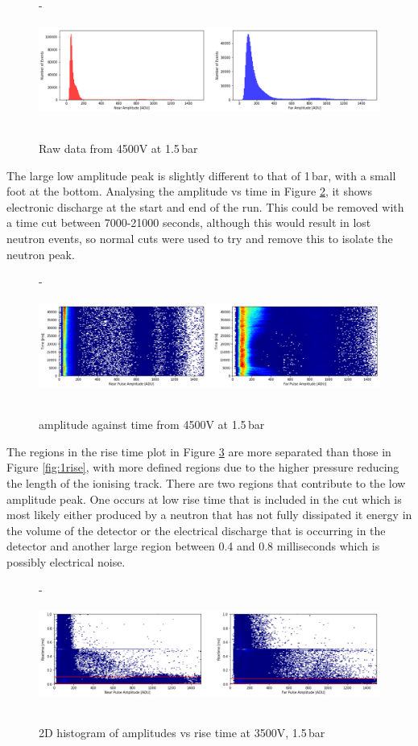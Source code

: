 \documentclass[a4paper]{article}
\begin{document}
\begin{figure}[H]- 
    \centering
    \includegraphics[height=3.7cm]{uk24n002_ampbefore.png}
    \caption{Raw data from 4500V at 1.5\,bar}
    \label{fig:2bef}
\end{figure}
\noindent The large low amplitude peak is slightly different to that of 1\,bar, with a small foot at the bottom. Analysing the amplitude vs time in Figure \ref{fig:2tim}, it shows electronic discharge at the start and end of the run. This could be removed with a time cut between 7000-21000 seconds, although this would result in lost neutron events, so normal cuts were used to try and remove this to isolate the neutron peak.
\begin{figure}[H]- 
    \centering
    \includegraphics[height=3.7cm]{uk24n002_time.png}
    \caption{amplitude against time from 4500V at 1.5\,bar}
    \label{fig:2tim}
\end{figure}
\noindent The regions in the rise time plot in Figure \ref{fig:2rise} are more separated than those in Figure \ref{fig:1rise}, with more defined regions due to the higher pressure reducing the length of the ionising track. There are two regions that contribute to the low amplitude peak. One occurs at low rise time that is included in the cut which is most likely either produced by a neutron that has not fully dissipated it energy in the volume of the detector or the electrical discharge that is occurring in the detector and another large region between 0.4 and 0.8 milliseconds which is possibly electrical noise.
\begin{figure}[H]-
\centering
\includegraphics[height=3.7cm]{uk24n002_rise.png}
\caption{2D histogram of amplitudes vs rise time at 3500V, 1.5\,bar}
\label{fig:2rise}
\end{figure}
\end{document}
